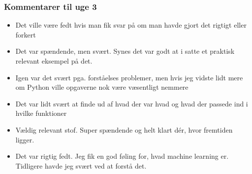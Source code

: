 \documentclass{article}
\begin{document}
    \subsubsection{Kommentarer til uge 3}
    \begin{itemize}
        \item Det ville være fedt hvis man fik svar på om man havde gjort det
              rigtigt eller forkert

        \item Det var spændende, men svært. Synes det var godt at i satte et
              praktisk relevant eksempel på det.

        \item Igen var det svært pga. forståelses problemer, men hvis jeg vidste
              lidt mere om Python ville opgaverne nok være væsentligt nemmere

        \item Det var lidt svært at finde ud af hvad der var hvad og hvad der
              passede ind i hvilke funktioner

        \item Vældig relevant stof. Super spændende og helt klart dér, hvor
              fremtiden ligger.

        \item Det var rigtig fedt. Jeg fik en god føling for, hvad machine
              learning er. Tidligere havde jeg svært ved at forstå det.
    \end{itemize}
\end{document}
